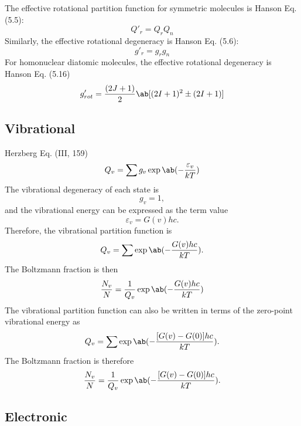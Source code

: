 \documentclass[11pt, twoside, fleqn]{report}
\begin{document}
The effective rotational partition function for symmetric molecules is Hanson Eq. (5.5):
\begin{equation*}
    Q'_{r} = Q_{r}Q_{n}
\end{equation*}
Similarly, the effective rotational degeneracy is Hanson Eq. (5.6):
\begin{equation*}
    g'_{r} = g_{r}g_{n}
\end{equation*}
For homonuclear diatomic molecules, the effective rotational degeneracy is Hanson Eq. (5.16)
\begin{equation*}
    g'_{rot} = \frac{(2J + 1)}{2}\ab[(2I + 1)^{2} \pm (2I + 1)]
\end{equation*}

\subsection{Vibrational}

Herzberg Eq. (III, 159)
\begin{equation*}
    Q_{v} = \sum g_{v}\exp\ab(-\frac{\varepsilon_{v}}{kT})
\end{equation*}
The vibrational degeneracy of each state is
\begin{equation*}
    g_{v} = 1,
\end{equation*}
and the vibrational energy can be expressed as the term value
\begin{equation*}
    \varepsilon_{v} = G(v)hc.
\end{equation*}
Therefore, the vibrational partition function is
\begin{equation*}
    Q_{v} = \sum \exp\ab(-\frac{G(v)hc}{kT}).
\end{equation*}
The Boltzmann fraction is then
\begin{equation*}
    \frac{N_{v}}{N} = \frac{1}{Q_{v}}\exp\ab(-\frac{G(v)hc}{kT})
\end{equation*}
The vibrational partition function can also be written in terms of the zero-point vibrational energy as
\begin{equation*}
    Q_{v} = \sum \exp\ab(-\frac{[G(v) - G(0)]hc}{kT}).
\end{equation*}
The Boltzmann fraction is therefore
\begin{equation*}
    \frac{N_{v}}{N} = \frac{1}{Q_{v}}\exp\ab(-\frac{[G(v) - G(0)]hc}{kT}).
\end{equation*}

\subsection{Electronic}
\end{document}
